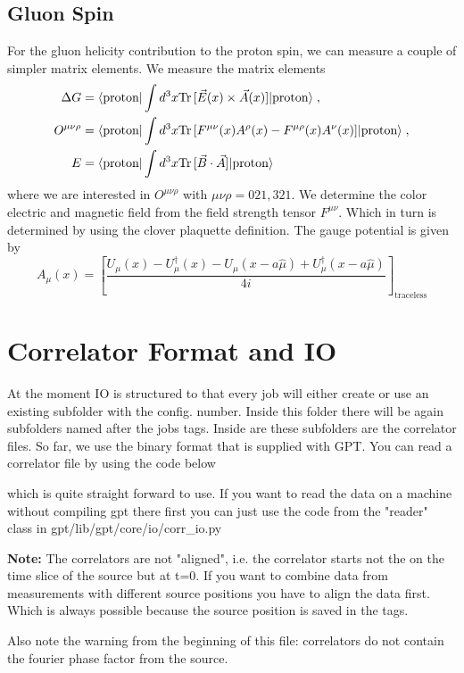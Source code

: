 \documentclass[a4paper,10pt]{scrartcl}
\newcommand{\tr}{\text{Tr\,}}
\begin{document}
\subsection{Gluon Spin}
For the gluon helicity contribution to the proton spin, we can measure a couple of simpler matrix elements. We measure the matrix elements
\begin{align}
    \Delta G &= \langle \text{proton} | \int d^3x \tr [ \vec E(x) \times \vec A(x)] | \text{proton} \rangle \; , \\
    O^{\mu \nu \rho} &= \langle \text{proton} | \int d^3x \tr [ F^{\mu \nu}(x) A^\rho(x) - F^{\mu \rho}(x) A^\nu(x)] | \text{proton} \rangle \; , \\
    E &= \langle \text{proton} | \int d^3x \tr [ \vec B \cdot \vec A] | \text{proton} \rangle \notag \;
\end{align}
where we are interested in $O^{\mu \nu \rho}$ with $\mu \nu \rho = 021, 321$. We determine the color electric and magnetic field from the field strength
tensor $F^{\mu \nu}$. Which in turn is determined by using the clover plaquette definition. The gauge potential is given by 
\begin{equation}
    A_\mu(x) = \left[ \frac{U_\mu(x)- U_\mu^\dagger(x) - U_\mu(x - a \hat \mu) + U_\mu^\dagger(x - a \hat \mu)}{4 i} \right]_\text{traceless}
\end{equation}

\section{Correlator Format and IO}
At the moment IO is structured to that every job will either create or use an existing subfolder with the config. number. Inside this folder there will be again
subfolders named after the jobs tags. Inside are these subfolders are the correlator files. So far, we use the binary format that is supplied with GPT. You
can read a correlator file by using the code below

which is quite straight forward to use. If you want to read the data on a machine without compiling gpt there first you can just use the code from the "reader" 
class in gpt/lib/gpt/core/io/corr\_io.py 

\textbf{Note:} The correlators are not "aligned", i.e. the correlator starts not the on the time slice of the source but at t=0. If you want to combine data from
measurements with different source positions you have to align the data first. Which is always possible because the source position is saved in the tags.

Also note the warning from the beginning of this file: correlators do not contain the fourier phase factor from the source.
\end{document}
